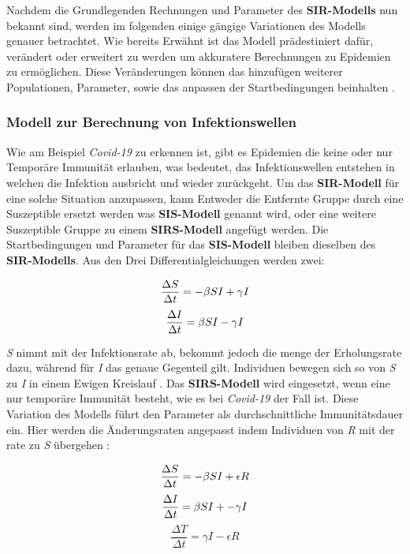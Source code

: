 \documentclass[12pt]{scrartcl} %
\begin{document}
Nachdem die Grundlegenden Rechnungen und Parameter des \textbf{SIR-Modells} nun bekannt sind, werden im folgenden einige gängige Variationen des Modells genauer betrachtet. Wie bereits Erwähnt ist das Modell prädestiniert dafür, verändert oder erweitert zu werden um akkuratere Berechnungen zu Epidemien zu ermöglichen. Diese Veränderungen können das hinzufügen weiterer Populationen, Parameter, sowie das anpassen der Startbedingungen beinhalten \cite{5}.


\subsubsection{Modell zur Berechnung von Infektionswellen}

Wie am Beispiel \textsl{Covid-19} zu erkennen ist, gibt es Epidemien die keine oder nur Temporäre Immunität erlauben, was bedeutet, das Infektionswellen entstehen in welchen die Infektion ausbricht und wieder zurückgeht. Um das \textbf{SIR-Modell} für eine solche Situation anzupassen, kann Entweder die Entfernte Gruppe durch eine Suszeptible ersetzt werden was \textbf{SIS-Modell} genannt wird, oder eine weitere Suszeptible Gruppe zu einem \textbf{SIRS-Modell} angefügt werden. Die Startbedingungen und Parameter für das \textbf{SIS-Modell} bleiben dieselben des \textbf{SIR-Modells}. Aus den Drei Differentialgleichungen werden zwei:

$$ \frac{\Delta S}{\Delta t} = -\beta\space S I + \gamma I $$
$$ \frac{\Delta I}{\Delta t} = \beta\space S I - \gamma I$$

\textit{S} nimmt mit der Infektionsrate \textbeta\space ab, bekommt jedoch die menge der Erholungsrate \textgamma\space dazu, während für \textit{I} das genaue Gegenteil gilt. Individuen bewegen sich so von \textit{S} zu \textit{I} in einem Ewigen Kreislauf
 \cite{5}. Das \textbf{SIRS-Modell} wird eingesetzt, wenn eine nur temporäre Immunität besteht, wie es bei \textsl{Covid-19} der Fall ist. Diese Variation des Modells führt den Parameter \textepsilon\space als durchschnittliche Immunitätsdauer ein. Hier werden die Änderungsraten angepasst indem Individuen von \textit{R} mit der rate \textepsilon\space zu \textit{S} übergehen \cite{8}:

$$ \frac{\Delta S}{\Delta t} = -\beta\space S I + \epsilon R $$
$$ \frac{\Delta I}{\Delta t} = \beta\space S I + -\gamma I $$
$$ \frac{\Delta T}{\Delta t} = \gamma I - \epsilon R $$

\end{document}

